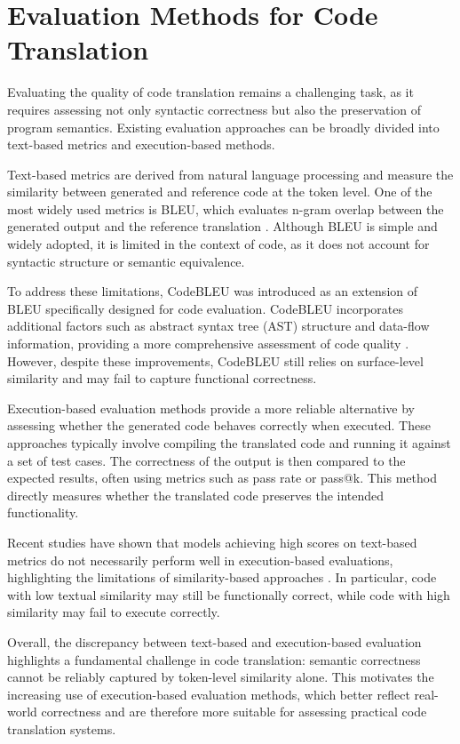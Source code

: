 \section{Evaluation Methods for Code Translation}


Evaluating the quality of code translation remains a challenging task, as it
requires assessing not only syntactic correctness but also the preservation of
program semantics. Existing evaluation approaches can be broadly divided into
text-based metrics and execution-based methods.

Text-based metrics are derived from natural language processing and measure the
similarity between generated and reference code at the token level. One of the
most widely used metrics is BLEU, which evaluates n-gram overlap between the
generated output and the reference translation \cite{bleu_metric}. Although BLEU
is simple and widely adopted, it is limited in the context of code, as it does
not account for syntactic structure or semantic equivalence.

To address these limitations, CodeBLEU was introduced as an extension of BLEU
specifically designed for code evaluation. CodeBLEU incorporates additional
factors such as abstract syntax tree (AST) structure and data-flow information,
providing a more comprehensive assessment of code quality
\cite{ren2020codebleu}. However, despite these improvements, CodeBLEU still
relies on surface-level similarity and may fail to capture functional
correctness.

Execution-based evaluation methods provide a more reliable alternative by
assessing whether the generated code behaves correctly when executed. These
approaches typically involve compiling the translated code and running it
against a set of test cases. The correctness of the output is then compared to
the expected results, often using metrics such as pass rate or pass@k. This
method directly measures whether the translated code preserves the intended
functionality.

Recent studies have shown that models achieving high scores on text-based
metrics do not necessarily perform well in execution-based evaluations,
highlighting the limitations of similarity-based approaches
\cite{huang2022exeds}. In particular, code with low textual similarity may still
be functionally correct, while code with high similarity may fail to execute
correctly.

Overall, the discrepancy between text-based and execution-based evaluation
highlights a fundamental challenge in code translation: semantic correctness
cannot be reliably captured by token-level similarity alone. This motivates the
increasing use of execution-based evaluation methods, which better reflect
real-world correctness and are therefore more suitable for assessing practical
code translation systems.